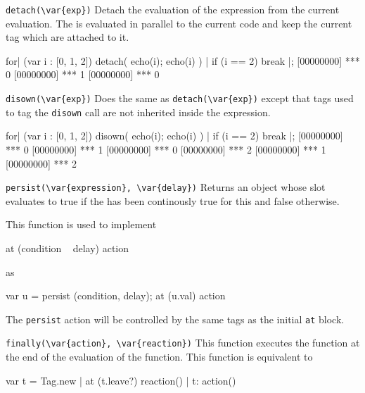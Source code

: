 \begin{urbiscriptapi}

\item \lstinline|detach(\var{exp})|
  Detach the evaluation of the expression  from the current
  evaluation.  The  is evaluated in parallel to the current code
  and keep the current tag which are attached to it.

\begin{urbiscript}
for| (var i : [0, 1, 2])
{
  detach({
    echo(i);
    echo(i)
  }) |
  if (i == 2)
    break
}|;
[00000000] *** 0
[00000000] *** 1
[00000000] *** 0
\end{urbiscript}

\item \lstinline|disown(\var{exp})|
  Does the same as \lstinline|detach(\var{exp})| except that tags used to
  tag the \lstinline|disown| call are not inherited inside the expression.

\begin{urbiscript}
for| (var i : [0, 1, 2])
{
  disown({
    echo(i);
    echo(i)
  }) |
  if (i == 2)
    break
}|;
[00000000] *** 0
[00000000] *** 1
[00000000] *** 0
[00000000] *** 2
[00000000] *** 1
[00000000] *** 2
\end{urbiscript}

\item \lstinline|persist(\var{expression}, \var{delay})|
   Returns an object whose  slot evaluates to true if the
    has been continously true for this  and false
   otherwise.
  
   This function is used to implement

\begin{urbiunchecked}
at (condition ~ delay)
  action
\end{urbiunchecked}

   as

\begin{urbiunchecked}
var u = persist (condition, delay);
at (u.val)
  action
\end{urbiunchecked}
  
   The \lstinline|persist| action will be controlled by the same tags as the
   initial \lstinline|at| block.


\item \lstinline|finally(\var{action}, \var{reaction})|
  This function executes the  function at the end of the evaluation of
  the  function.  This function is equivalent to

\begin{urbiunchecked}
{
  var t = Tag.new |
  at (t.leave?)
    reaction() |
  t: action()
}
\end{urbiunchecked}


\end{urbiscriptapi}


